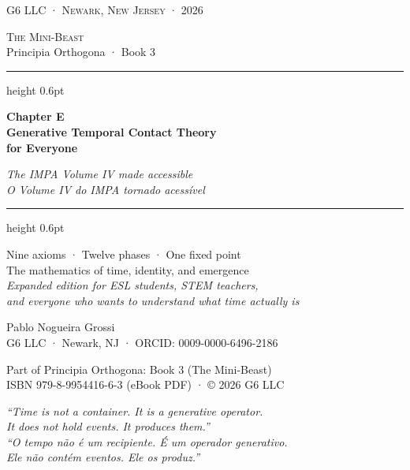 \documentclass[12pt, openright]{book}
\newcommand{\bilingualq}[2]{%
  \begin{center}
  \begin{minipage}{0.85\textwidth}
  \small\color{beastblue}\itshape #1\\[0.3em]
  \color{gray}\itshape #2
  \end{minipage}
  \end{center}
}
\theoremstyle{definition}
\theoremstyle{remark}
\begin{document}
\frontmatter

\begin{titlepage}
\centering\vspace*{1.5cm}
{\footnotesize\color{beastgold}\textsc{G6 LLC · Newark, New Jersey · 2026}}
\vspace{1cm}

{\Large\color{beastblue}\textsc{The Mini-Beast}}\\[0.3em]
{\small\color{gray}Principia Orthogona · Book 3}
\vspace{0.8cm}

{\color{beastgold}\hrule height 0.6pt}
\vspace{0.5cm}

{\LARGE\bfseries\color{beastblue}
Chapter E\\[0.3em]
Generative Temporal Contact Theory\\[0.3em]
for Everyone}

\vspace{0.4cm}
{\large\color{beastred}\itshape
The IMPA Volume IV made accessible\\
\textit{O Volume IV do IMPA tornado acessível}}

\vspace{0.5cm}
{\color{beastgold}\hrule height 0.6pt}
\vspace{1cm}

{\normalsize\color{beastblue}
Nine axioms · Twelve phases · One fixed point\\
The mathematics of time, identity, and emergence\\[0.5em]
\textit{Expanded edition for ESL students, STEM teachers,\\
and everyone who wants to understand what time actually is}
}

\vspace{1.5cm}
{\large\color{beastblue} Pablo Nogueira Grossi}\\[0.3em]
{\small\color{gray}G6 LLC · Newark, NJ · ORCID: 0009-0000-6496-2186}

\vfill
{\footnotesize\color{gray}
Part of Principia Orthogona: Book 3 (The Mini-Beast)\\
ISBN 979-8-9954416-6-3 (eBook PDF) · \copyright{} 2026 G6 LLC
}
\end{titlepage}

\clearpage\thispagestyle{empty}\vspace*{2cm}

\bilingualq{%
``Time is not a container. It is a generative operator.\\
It does not hold events. It produces them.''
}{%
``O tempo não é um recipiente. É um operador generativo.\\
Ele não contém eventos. Ele os produz.''}
\end{document}
